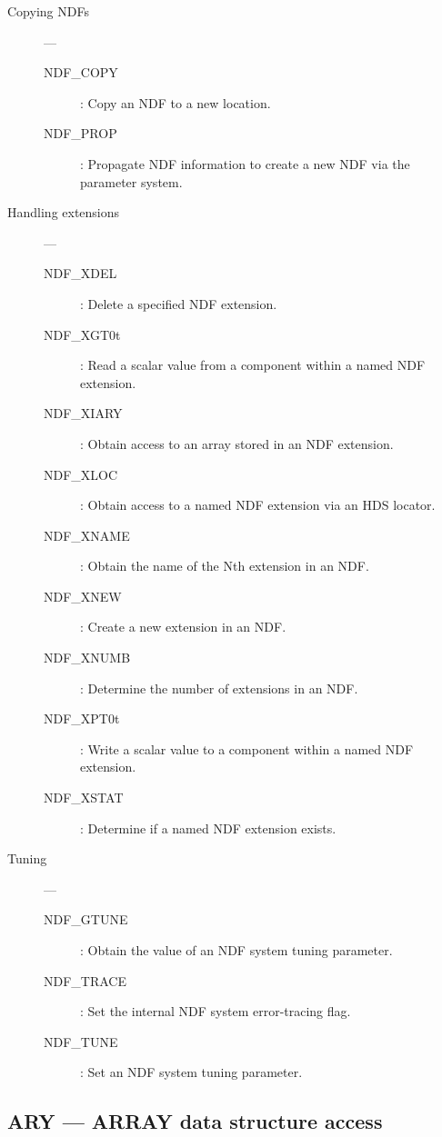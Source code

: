 \begin{description}
\item [Copying NDFs] ---

\begin{description}
\item [NDF\_COPY] : Copy an NDF to a new location.
\item [NDF\_PROP] : Propagate NDF information to create a new NDF via the parameter system.
\end{description}

\item [Handling extensions] ---

\begin{description}
\item [NDF\_XDEL] : Delete a specified NDF extension.
\item [NDF\_XGT0t] : Read a scalar value from a component within a named NDF extension.
\item [NDF\_XIARY] : Obtain access to an array stored in an NDF extension.
\item [NDF\_XLOC] : Obtain access to a named NDF extension via an HDS locator.
\item [NDF\_XNAME] : Obtain the name of the Nth extension in an NDF.
\item [NDF\_XNEW] : Create a new extension in an NDF.
\item [NDF\_XNUMB] : Determine the number of extensions in an NDF.
\item [NDF\_XPT0t] : Write a scalar value to a component within a named NDF extension.
\item [NDF\_XSTAT] : Determine if a named NDF extension exists.
\end{description}

\item [Tuning] ---

\begin{description}
\item [NDF\_GTUNE] : Obtain the value of an NDF system tuning parameter.
\item [NDF\_TRACE] : Set the internal NDF system error-tracing flag.
\item [NDF\_TUNE] : Set an NDF system tuning parameter.
\end{description}

\end{description}

\newpage

\subsection{ARY --- ARRAY data structure access}

